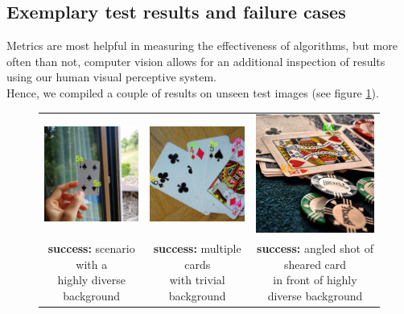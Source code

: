 \documentclass[a4paper]{article}
\begin{document}
\subsection*{Exemplary test results and failure cases}
Metrics are most helpful in measuring the effectiveness of algorithms, but more often than not, computer vision allows for an additional inspection of results using our human visual perceptive system. \\Hence, we compiled a couple of results on unseen test images (see figure \ref{fig:testcases}).
\begin{figure}[h]
\label{fig:testcases}
\begin{tabular}{ccc}

 \includegraphics[width=44mm]{images/success3} &   \includegraphics[width=44mm]{images/success2} &   \includegraphics[width=44mm]{images/success1}\\
\makecell{\textbf{success:} scenario with a \\ highly diverse background}  & \makecell{\textbf{success:}  multiple cards \\ with trivial background} & \makecell{\textbf{success:}  angled shot of sheared card \\ in front of highly diverse background}\\[6pt]

\end{tabular}
\end{figure}
\end{document}
